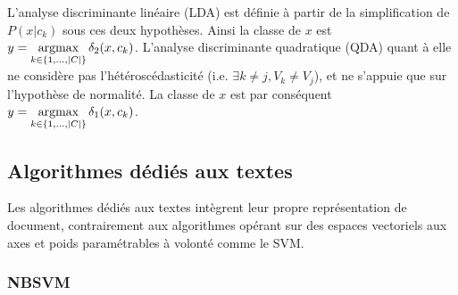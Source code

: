 L'analyse discriminante linéaire (LDA) \citep{fisher1936linearDA} %
est définie à partir de la simplification de $P(x \vert c_k)$ sous ces deux hypothèses. Ainsi la classe de $x$ est $y = \mathop{\mathrm{argmax}}\limits_{k \in \lbrace 1,...,{\vert C\vert} \rbrace} \delta_2(x, c_k)$.
L'analyse discriminante quadratique (QDA) \citep{McLachlan1992DiscrAnalyStatPattRecog-QDA} quant à elle ne considère pas l'hétéroscédasticité (i.e. $\exists k \neq j, V_k \neq V_j$), et ne s'appuie que sur l'hypothèse de normalité. La classe de $x$ est par conséquent $y = \mathop{\mathrm{argmax}}\limits_{k \in \lbrace 1,...,{\vert C\vert} \rbrace} \delta_1(x, c_k)$.



\subsection{Algorithmes dédiés aux textes}
Les algorithmes dédiés aux textes intègrent leur propre représentation de document, contrairement aux algorithmes opérant sur des espaces vectoriels aux axes et poids paramétrables à volonté comme le SVM. %


\subsubsection{NBSVM}

